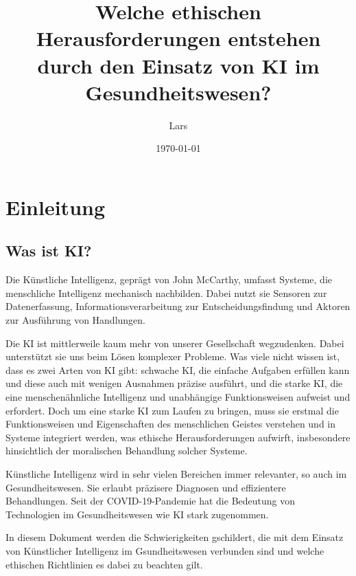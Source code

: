 \documentclass{report}
\title{Welche ethischen Herausforderungen entstehen durch den Einsatz von KI im Gesundheitswesen?}
\author{Lars}
\date{\today}
\begin{document}
\maketitle


\tableofcontents

\chapter{Einleitung}

\section{Was ist KI?}
Die Künstliche Intelligenz, geprägt von John McCarthy, umfasst Systeme, die menschliche Intelligenz mechanisch nachbilden. Dabei nutzt sie Sensoren zur Datenerfassung, Informationsverarbeitung zur Entscheidungsfindung und Aktoren zur Ausführung von Handlungen. 

\vspace{2mm}Die KI ist mittlerweile kaum mehr von unserer Gesellschaft wegzudenken. Dabei unterstützt sie uns beim Lösen komplexer Probleme. Was viele nicht wissen ist, dass es zwei Arten von KI gibt: schwache KI, die einfache Aufgaben erfüllen kann und diese auch mit wenigen Ausnahmen präzise ausführt, und die starke KI, die eine menschenähnliche Intelligenz und unabhängige Funktionsweisen aufweist und erfordert. Doch um eine starke KI zum Laufen zu bringen, muss sie erstmal die Funktionsweisen und Eigenschaften des menschlichen Geistes verstehen und in Systeme integriert werden, was ethische Herausforderungen aufwirft, insbesondere hinsichtlich der moralischen Behandlung solcher Systeme.

\vspace{2mm}Künstliche Intelligenz wird in sehr vielen Bereichen immer relevanter, so auch im Gesundheitswesen. Sie erlaubt präzisere Diagnosen und effizientere Behandlungen. Seit der COVID-19-Pandemie hat die Bedeutung von Technologien im Gesundheitswesen wie KI stark zugenommen.

\vspace{2mm}In diesem Dokument werden die Schwierigkeiten gschildert, die mit dem Einsatz von Künstlicher Intelligenz im Gsundheitswesen verbunden sind und welche ethischen Richtlinien es dabei zu beachten gilt.
\end{document}
